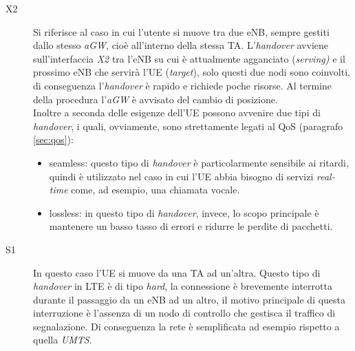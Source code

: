  \begin{description}
  \item[X2] Si riferisce al caso in cui l'utente si muove tra due \ac{eNB}, sempre gestiti dallo stesso \emph{aGW}, cioè all'interno della
  stessa \ac{TA}. L'\emph{handover} avviene sull'interfaccia \emph{X2} tra l'\ac{eNB} su cui è attualmente agganciato (\emph{serving)} e
  il prossimo \ac{eNB} che servirà l'\ac{UE} (\emph{target}), solo questi due nodi sono coinvolti, di conseguenza l'\emph{handover} è
  rapido e richiede poche risorse. Al termine della procedura l'\emph{aGW} è avvisato del cambio di posizione. \\
  Inoltre a seconda delle esigenze dell'\ac{UE} possono avvenire due tipi di \emph{handover}, i quali, ovviamente, sono strettamente legati
  al \ac{QoS} (paragrafo \ref{sec:qos}):
  \begin{itemize}
   \item seamless: questo tipo di \emph{handover} è particolarmente sensibile ai ritardi, quindi è utilizzato nel caso in cui l'\ac{UE} 
   abbia bisogno di servizi \emph{real-time} come, ad esempio, una chiamata vocale.
   \item lossless: in questo tipo di \emph{handover}, invece, lo scopo principale è mantenere un basso tasso di errori e ridurre le perdite
   di pacchetti.
  \end{itemize}

  \item[S1] In questo caso l'\ac{UE} si muove da una \ac{TA} ad un'altra. Questo tipo di \emph{handover} in \ac{LTE} è di tipo \emph{hard},
  la connessione è brevemente interrotta durante il passaggio da un \ac{eNB} ad un altro, il motivo principale di questa interruzione è
  l'assenza di un nodo di controllo che gestisca il traffico di segnalazione. Di conseguenza la rete è semplificata ad esempio rispetto a
  quella \emph{UMTS}.
 \end{description}

 
 
